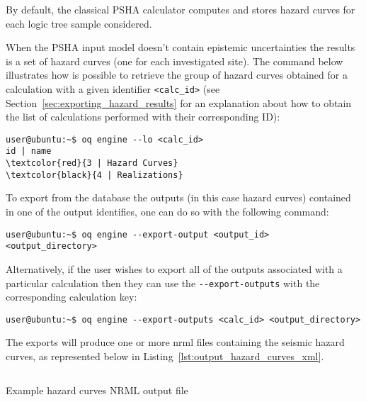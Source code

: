 By default, the classical PSHA calculator computes and stores hazard curves
for each logic tree sample considered.

When the PSHA input model doesn't contain epistemic uncertainties the results
is a set of hazard curves (one for each investigated site). The command below
illustrates how is possible to retrieve the group of hazard curves obtained
for a calculation with a given identifier \texttt{<calc\_id>} (see
Section~\ref{sec:exporting_hazard_results} for an explanation about how to
obtain the list of calculations performed with their corresponding ID):

\begin{Verbatim}[frame=single, commandchars=\\\{\}, fontsize=\small]
user@ubuntu:~$ oq engine --lo <calc_id>
id | name
\textcolor{red}{3 | Hazard Curves}
\textcolor{black}{4 | Realizations}
\end{Verbatim}

To export from the database the outputs (in this case hazard curves) contained
in one of the output identifies, one can do so with the following command:

\begin{Verbatim}[frame=single, commandchars=\\\{\}, fontsize=\small]
user@ubuntu:~$ oq engine --export-output <output_id> <output_directory>
\end{Verbatim}

Alternatively, if the user wishes to export all of the outputs associated with
a particular calculation then they can use the \texttt{-{}-export-outputs}
with the corresponding calculation key:

\begin{Verbatim}[frame=single, commandchars=\\\{\}, fontsize=\small]
user@ubuntu:~$ oq engine --export-outputs <calc_id> <output_directory>
\end{Verbatim}

The exports will produce one or more nrml files containing the seismic hazard
curves, as represented below in Listing~\ref{lst:output_hazard_curves_xml}.

\begin{listing}[htbp]
  \inputminted[firstline=1,firstnumber=1,fontsize=\footnotesize,frame=single,linenos,bgcolor=lightgray]{xml}{oqum/hazard/verbatim/output_hazard_curves.xml}
  \caption{Example hazard curves NRML output file}
  \label{lst:output_hazard_curves_xml}
\end{listing}

